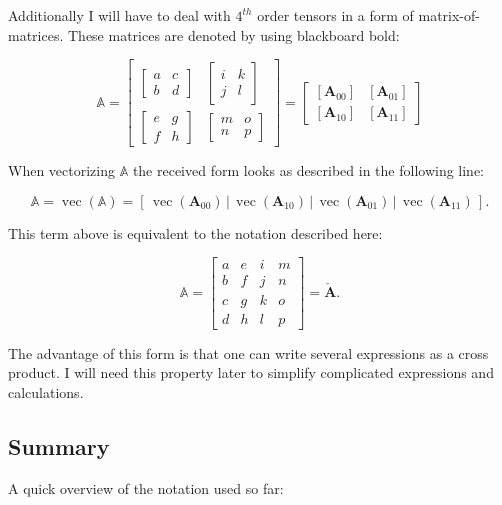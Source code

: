 Additionally I will have to deal with $4^{th}$ order tensors in a form of matrix-of-matrices. These matrices are denoted by using blackboard bold:

\[
\mathbb{A} = 
\left[\begin{array}{cc}{\begin{bmatrix} a & c \\ b & d \end{bmatrix}} & {\begin{bmatrix} i & k \\ j & l \end{bmatrix}} \\ {\begin{bmatrix} e & g \\ f & h \end{bmatrix}} & {\begin{bmatrix} m & o \\ n & p \end{bmatrix}}\end{array}\right]
=
\left[\begin{array}{cc}{\left[\mathbf{A}_{00}\right]} & {\left[\mathbf{A}_{01}\right]} \\ {\left[\mathbf{A}_{10}\right]} & {\left[\mathbf{A}_{11}\right]}\end{array}\right]
\]

When vectorizing $\mathbb{A}$ the received form looks as described in the following line:

\[
\mathbb{A} = \operatorname{vec}(\mathbb{A})= \left[ \,\operatorname{vec}\left(\mathbf{A}_{00}\right)\, \bigg| \,\operatorname{vec}\left(\mathbf{A}_{10}\right)\, \bigg| \,\operatorname{vec}\left(\mathbf{A}_{01}\right)\, \bigg| \,\operatorname{vec}\left(\mathbf{A}_{11}\right)\, \right].
\]

This term above is equivalent to the notation described here:

\[
\mathbb{A}=\left[\begin{array}{llll}{a} & {e} & {i} & {m} \\ {b} & {f} & {j} & {n} \\ {c} & {g} & {k} & {o} \\ {d} & {h} & {l} & {p}\end{array}\right] 
=\mathbf{\check{A}}.
\]

The advantage of this form is that one can write several expressions as a cross product. I will need this property later to simplify complicated expressions and calculations.


\subsection{Summary}
A quick overview of the notation used so far:

